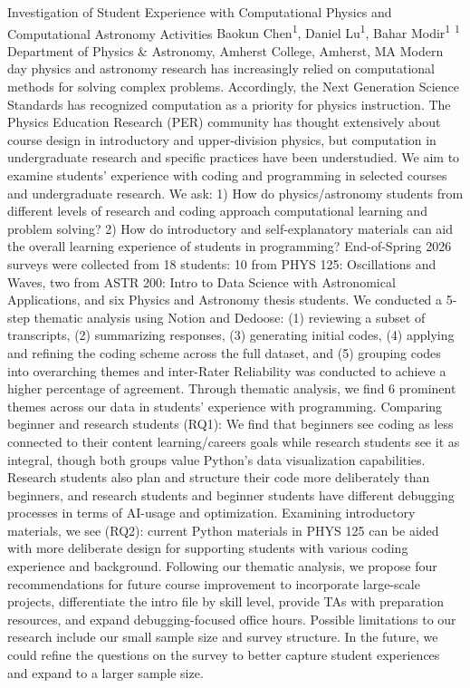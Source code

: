 \makeabstract
    {
    Investigation of Student Experience with Computational Physics and Computational Astronomy Activities  
    }
    {
    Baokun Chen\textsuperscript{1}, Daniel Lu\textsuperscript{1}, Bahar Modir\textsuperscript{1}
    }
    {
    \textsuperscript{1} Department of Physics \& Astronomy, Amherst College, Amherst, MA
    }
    {
    Modern day physics and astronomy research has increasingly relied on computational methods for solving complex problems. Accordingly, the Next Generation Science Standards has recognized computation as a priority for physics instruction. The Physics Education Research (PER) community has thought extensively about course design in introductory and upper-division physics, but computation in undergraduate research and specific practices have been understudied. We aim to examine students' experience with coding and programming in selected courses and undergraduate research. We ask: 1) How do physics/astronomy students from different levels of research and coding approach computational learning and problem solving? 2) How do introductory and self-explanatory materials can aid the overall learning experience of students in programming?
    }
    {
    End-of-Spring 2026 surveys were collected from 18 students: 10 from PHYS 125: Oscillations and Waves, two from ASTR 200: Intro to Data Science with Astronomical Applications, and six Physics and Astronomy thesis students. We conducted a 5-step thematic analysis using Notion and Dedoose: (1) reviewing a subset of transcripts, (2) summarizing responses, (3) generating initial codes, (4) applying and refining the coding scheme across the full dataset, and (5) grouping codes into overarching themes and inter-Rater Reliability was conducted to achieve a higher percentage of agreement.
    }
    {
    Through thematic analysis, we find 6 prominent themes across our data in students' experience with programming. Comparing beginner and research students (RQ1): We find that beginners see coding as less connected to their content learning/careers goals while research students see it as integral, though both groups value Python's data visualization capabilities. Research students also plan and structure their code more deliberately than beginners, and research students and beginner students have different debugging processes in terms of AI-usage and optimization. Examining introductory materials, we see (RQ2): current Python materials in PHYS 125 can be aided with more deliberate design for supporting students with various coding experience and background.
    }
    {
    Following our thematic analysis, we propose four recommendations for future course improvement to incorporate large-scale projects, differentiate the intro file by skill level, provide TAs with preparation resources, and expand debugging-focused office hours. Possible limitations to our research include our small sample size and survey structure. In the future, we could refine the questions on the survey to better capture student experiences and expand to a larger sample size.
    }

    \newpage
    